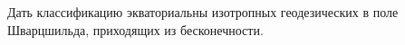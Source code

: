 \begin{tproblem}
   Дать классификацию экваториальны изотропных геодезических в поле
   Шварцшильда, приходящих из бесконечности.
\end{tproblem}
